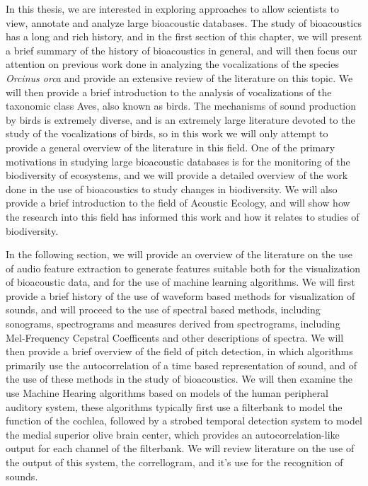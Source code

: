 \label{chapter:related_work}

In this thesis, we are interested in exploring approaches to allow
scientists to view, annotate and analyze large bioacoustic databases.
The study of bioacoustics has a long and rich history, and in the
first section of this chapter, we will present a brief summary of the
history of bioacoustics in general, and will then focus our attention
on previous work done in analyzing the vocalizations of the species
\textit{Orcinus orca} and provide an extensive review of the
literature on this topic.  We will then provide a brief introduction
to the analysis of vocalizations of the taxonomic class Aves, also
known as birds.  The mechanisms of sound production by birds is
extremely diverse, and is an extremely large literature devoted to the
study of the vocalizations of birds, so in this work we will only
attempt to provide a general overview of the literature in this field.
One of the primary motivations in studying large bioacoustic databases
is for the monitoring of the biodiversity of ecosystems, and we will
provide a detailed overview of the work done in the use of
bioacoustics to study changes in biodiversity.  We will also provide a
brief introduction to the field of Acoustic Ecology, and will show how
the research into this field has informed this work and how it relates
to studies of biodiversity.

In the following section, we will provide an overview of the
literature on the use of audio feature extraction to generate features
suitable both for the visualization of bioacoustic data, and for the
use of machine learning algorithms.  We will first provide a brief
history of the use of waveform based methods for visualization of
sounds, and will proceed to the use of spectral based methods,
including sonograms, spectrograms and measures derived from
spectrograms, including Mel-Frequency Cepstral Coefficents and other
descriptions of spectra.  We will then provide a brief overview of the
field of pitch detection, in which algorithms primarily use the
autocorrelation of a time based representation of sound, and of the
use of these methods in the study of bioacoustics.  We will then
examine the use Machine Hearing algorithms based on models of the
human peripheral auditory system, these algorithms typically first use
a filterbank to model the function of the cochlea, followed by a
strobed temporal detection system to model the medial superior olive
brain center, which provides an autocorrelation-like output for each
channel of the filterbank.  We will review literature on the use of
the output of this system, the correllogram, and it's use for the
recognition of sounds.

